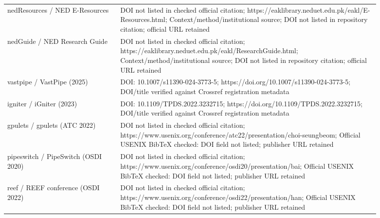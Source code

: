 \documentclass[12pt,a4paper]{article}
\begin{document}
\begin{longtable}{p{0.27\linewidth}p{0.62\linewidth}}
nedResources /\allowbreak{} NED E-Resources & DOI not listed in checked official citation; https:/\allowbreak{}/\allowbreak{}eaklibrary.neduet.edu.pk/\allowbreak{}eakl/\allowbreak{}E-Resources.html; Context/\allowbreak{}method/\allowbreak{}institutional source; DOI not listed in repository citation; official URL retained\\
nedGuide /\allowbreak{} NED Research Guide & DOI not listed in checked official citation; https:/\allowbreak{}/\allowbreak{}eaklibrary.neduet.edu.pk/\allowbreak{}eakl/\allowbreak{}ResearchGuide.html; Context/\allowbreak{}method/\allowbreak{}institutional source; DOI not listed in repository citation; official URL retained\\
vastpipe /\allowbreak{} VastPipe (2025) & DOI: 10.1007/\allowbreak{}s11390-024-3773-5; https:/\allowbreak{}/\allowbreak{}doi.org/\allowbreak{}10.1007/\allowbreak{}s11390-024-3773-5; DOI/\allowbreak{}title verified against Crossref registration metadata\\
igniter /\allowbreak{} iGniter (2023) & DOI: 10.1109/\allowbreak{}TPDS.2022.3232715; https:/\allowbreak{}/\allowbreak{}doi.org/\allowbreak{}10.1109/\allowbreak{}TPDS.2022.3232715; DOI/\allowbreak{}title verified against Crossref registration metadata\\
gpulets /\allowbreak{} gpulets (ATC 2022) & DOI not listed in checked official citation; https:/\allowbreak{}/\allowbreak{}www.usenix.org/\allowbreak{}conference/\allowbreak{}atc22/\allowbreak{}presentation/\allowbreak{}choi-seungbeom; Official USENIX BibTeX checked: DOI field not listed; publisher URL retained\\
pipeswitch /\allowbreak{} PipeSwitch (OSDI 2020) & DOI not listed in checked official citation; https:/\allowbreak{}/\allowbreak{}www.usenix.org/\allowbreak{}conference/\allowbreak{}osdi20/\allowbreak{}presentation/\allowbreak{}bai; Official USENIX BibTeX checked: DOI field not listed; publisher URL retained\\
reef /\allowbreak{} REEF conference (OSDI 2022) & DOI not listed in checked official citation; https:/\allowbreak{}/\allowbreak{}www.usenix.org/\allowbreak{}conference/\allowbreak{}osdi22/\allowbreak{}presentation/\allowbreak{}han; Official USENIX BibTeX checked: DOI field not listed; publisher URL retained\\
\bottomrule
\end{longtable}
\end{document}
